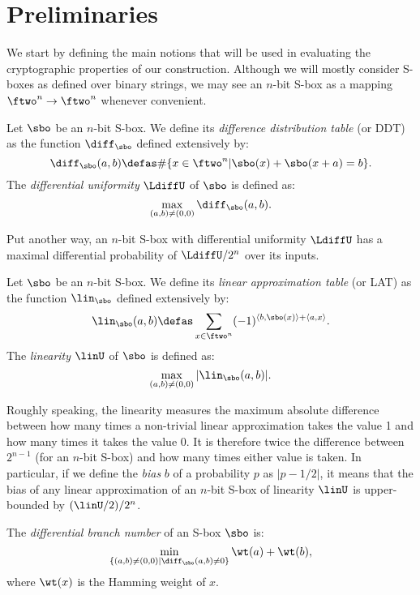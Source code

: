 \section{Preliminaries}

We start by defining the main notions that will be used in evaluating the cryptographic properties of our construction.
Although we will mostly consider S-boxes as defined over binary strings, we may see an $n$-bit S-box as a mapping
$\ftwo^n \rightarrow \ftwo^n$ whenever convenient.


\begin{defi}
Let $\sbo$ be an $n$-bit S-box. We define its
\emph{difference distribution table} (or DDT) as the function $\diff_{\sbo}$ defined extensively by:
\[
\diff_{\sbo}(a,b) \defas \#\{x \in \ftwo^n | \sbo(x) + \sbo(x + a) = b\}.
\]
The \emph{differential uniformity} $\LdiffU$ of $\sbo$ is defined as:
\[
\max_{(a,b) \neq (0,0)} \diff_{\sbo}(a,b).
\]
\end{defi}
Put another way, an $n$-bit S-box with differential uniformity $\LdiffU$ has a maximal differential probability
of $\LdiffU/2^n$ over its inputs.


\begin{defi}
Let $\sbo$ be an $n$-bit S-box. We define its
\emph{linear approximation table} (or LAT) as the function $\lin_{\sbo}$ defined extensively by:
\[
\lin_{\sbo}(a,b) \defas \sum_{x \in \ftwo^n} (-1)^{\langle b,\sbo(x)\rangle + \langle a, x\rangle}.
\]
The \emph{linearity} $\linU$ of $\sbo$ is defined as:
\[
\max_{(a,b) \neq (0,0)} |\lin_{\sbo}(a,b)|.
\]
\end{defi}
Roughly speaking, the linearity measures the maximum absolute difference between how many times a non-trivial linear approximation
takes the value 1 and how many times it takes the value 0. It is therefore twice the difference between $2^{n-1}$ (for an $n$-bit S-box)
and how many times either value is taken.
In particular, if we define the \emph{bias} $b$ of a probability $p$ as $|p - 1/2|$, it means that
the bias of any linear approximation of an $n$-bit S-box of linearity $\linU$ is upper-bounded by $(\linU/2)/2^n$.

\begin{defi}
The \emph{differential branch number} of an S-box $\sbo$ is:
\[
\min_{\{(a,b) \neq (0,0) | \diff_{\sbo}(a,b) \neq 0\}} \wt(a) + \wt(b),
\]
where $\wt(x)$ is the Hamming weight of $x$. 
\end{defi}


